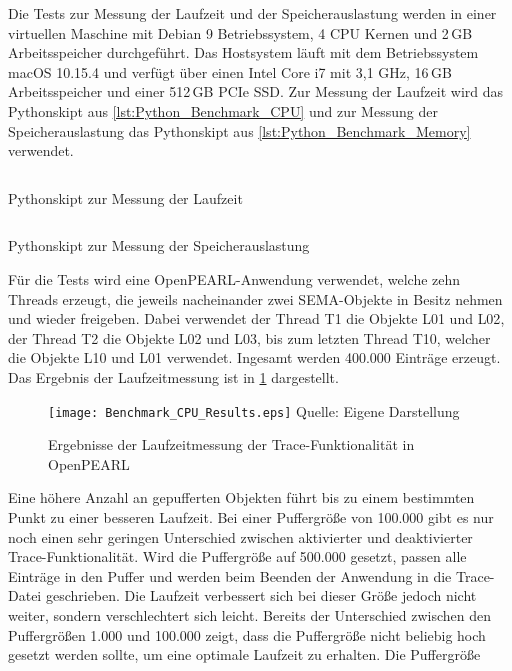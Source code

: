 Die Tests zur Messung der Laufzeit und der Speicherauslastung werden in einer
virtuellen Maschine mit Debian 9 Betriebssystem, 4 CPU Kernen und 2\,GB
Arbeitsspeicher durchgeführt. Das Hostsystem läuft mit dem Betriebssystem macOS
10.15.4 und verfügt über einen Intel Core i7 mit 3,1 GHz, 16\,GB Arbeitsspeicher
und einer 512\,GB PCIe SSD. Zur Messung der Laufzeit wird das Pythonskipt aus
\cref{lst:Python_Benchmark_CPU} und zur Messung der Speicherauslastung das
Pythonskipt aus \cref{lst:Python_Benchmark_Memory} verwendet.
\begin{listing}[ht]
  \inputminted[frame=lines,linenos]{python}{./Python/benchmark_cpu.py}
  \caption{Pythonskipt zur Messung der Laufzeit}
  \label{lst:Python_Benchmark_CPU}
\end{listing} 
\begin{listing}[ht]
  \inputminted[frame=lines,linenos]{python}{./Python/benchmark_memory.py}
  \caption{Pythonskipt zur Messung der Speicherauslastung}
  \label{lst:Python_Benchmark_Memory}
\end{listing}
Für die Tests wird eine OpenPEARL-Anwendung verwendet, welche zehn Threads
erzeugt, die jeweils nacheinander zwei \textrm{SEMA}-Objekte in Besitz nehmen
und wieder freigeben. Dabei verwendet der Thread \textrm{T1} die Objekte
\textrm{L01} und \textrm{L02}, der Thread \textrm{T2} die Objekte \textrm{L02}
und \textrm{L03}, bis zum letzten Thread \textrm{T10}, welcher die Objekte
\textrm{L10} und \textrm{L01} verwendet. Ingesamt werden 400.000 Einträge
erzeugt. Das Ergebnis der Laufzeitmessung ist in \cref{fig:BenchmarkCpuResults}
dargestellt. 
\begin{figure}[ht]
  \texttt{[image: Benchmark\_CPU\_Results.eps]}
  \footnotesize\sffamily Quelle: Eigene Darstellung
  \caption{Ergebnisse der Laufzeitmessung der Trace-Funktionalität in OpenPEARL}
  \label{fig:BenchmarkCpuResults}
\end{figure}
Eine höhere Anzahl an gepufferten Objekten führt bis zu einem bestimmten Punkt
zu einer besseren Laufzeit. Bei einer Puffergröße von 100.000 gibt es nur noch
einen sehr geringen Unterschied zwischen aktivierter und deaktivierter
Trace-Funktionalität. Wird die Puffergröße auf 500.000 gesetzt, passen alle
Einträge in den Puffer und werden beim Beenden der Anwendung in die Trace-Datei
geschrieben. Die Laufzeit verbessert sich bei dieser Größe jedoch nicht weiter,
sondern verschlechtert sich leicht. Bereits der Unterschied zwischen den
Puffergrößen 1.000 und 100.000 zeigt, dass die Puffergröße nicht beliebig hoch
gesetzt werden sollte, um eine optimale Laufzeit zu erhalten. Die Puffergröße
